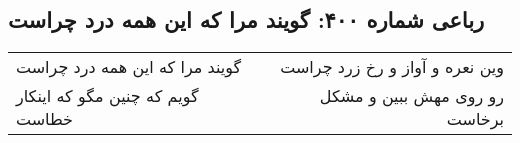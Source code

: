 \begin{center}
\section*{رباعی شماره ۴۰۰: گویند مرا که این همه درد چراست}
\label{sec:0400}
\begin{longtable}{l p{0.5cm} r}
گویند مرا که این همه درد چراست
&&
وین نعره و آواز و رخ زرد چراست
\\
گویم که چنین مگو که اینکار خطاست
&&
رو روی مهش ببین و مشکل برخاست
\\
\end{longtable}
\end{center}
